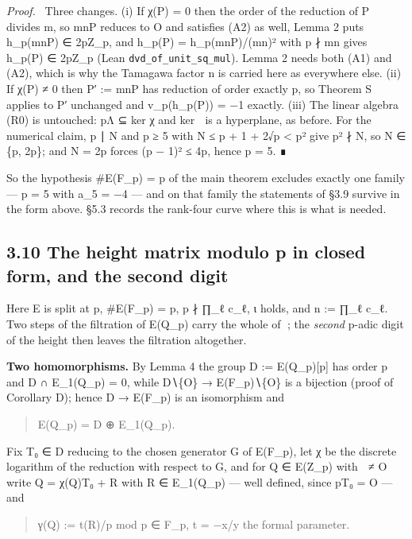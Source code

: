 \documentclass[11pt,a4paper]{article}
\theoremstyle{named}
\newenvironment{mdproof}[1][Proof]{\par\medskip\noindent\textit{#1.}\ }{\par\medskip}
\begin{document}
\begin{mdproof}[Proof]
Three changes. (i) If χ(P) = 0 then the order of the reduction of P divides m, so mnP reduces to O and satisfies (A2) as well, Lemma 2 puts h\_p(mnP) ∈ 2pZ\_p, and h\_p(P) = h\_p(mnP)/(mn)² with p ∤ mn gives h\_p(P) ∈ 2pZ\_p (Lean \texttt{dvd\_\allowbreak{}of\_\allowbreak{}unit\_\allowbreak{}sq\_\allowbreak{}mul}). Lemma 2 needs both (A1) and (A2), which is why the Tamagawa factor n is carried here as everywhere else. (ii) If χ(P) ≠ 0 then P′ := mnP has reduction of order exactly p, so Theorem S applies to P′ unchanged and v\_p(h\_p(P)) = −1 exactly. (iii) The linear algebra (R0) is untouched: pΛ ⊆ ker χ and ker  is a hyperplane, as before. For the numerical claim, p ∣ N and p ≥ 5 with N ≤ p + 1 + 2√p \textless{} p² give p² ∤ N, so N ∈ \{p, 2p\}; and N = 2p forces (p − 1)² ≤ 4p, hence p = 5. ∎
\end{mdproof}

So the hypothesis \#E(F\_p) = p of the main theorem excludes exactly one family — p = 5 with a\_5 = −4 — and on that family the statements of §3.9 survive in the form above. §5.3 records the rank-four curve where this is what is needed.

\subsection*{3.10 The height matrix modulo p in closed form, and the second digit}

Here E is split at p, \#E(F\_p) = p, p ∤ ∏\_ℓ c\_ℓ, ι holds, and n := ∏\_ℓ c\_ℓ. Two steps of the filtration of E(Q\_p) carry the whole of ; the \textit{second} p-adic digit of the height then leaves the filtration altogether.

\textbf{Two homomorphisms.} By Lemma 4 the group D := E(Q\_p)[p] has order p and D ∩ E\_1(Q\_p) = 0, while D∖\{O\} → E(F\_p)∖\{O\} is a bijection (proof of Corollary D); hence D → E(F\_p) is an isomorphism and

\begin{quote}
E(Q\_p) = D ⊕ E\_1(Q\_p).
\end{quote}

Fix T₀ ∈ D reducing to the chosen generator G of E(F\_p), let χ be the discrete logarithm of the reduction with respect to G, and for Q ∈ E(Z\_p) with  ≠ O write Q = χ(Q)T₀ + R with R ∈ E\_1(Q\_p) — well defined, since pT₀ = O — and

\begin{quote}
γ(Q) := t(R)/p mod p ∈ F\_p,  t = −x/y the formal parameter.
\end{quote}
\end{document}
